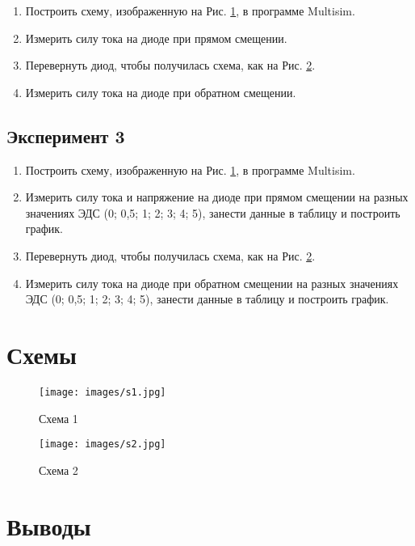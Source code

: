 \documentclass[12pt]{article}
\begin{document}
    \begin{enumerate}
        \item Построить схему, изображенную на Рис. \ref{fig:s:1}, в программе Multisim.
        \item Измерить силу тока на диоде при прямом смещении.
        \item Перевернуть диод, чтобы получилась схема, как на Рис. \ref{fig:s:2}.
        \item Измерить силу тока на диоде при обратном смещении.
    \end{enumerate}

    \subsection*{Эксперимент 3}

    \begin{enumerate}
        \item Построить схему, изображенную на Рис. \ref{fig:s:1}, в программе Multisim.
        \item Измерить силу тока и напряжение на диоде при прямом смещении на разных значениях ЭДС (0; 0,5; 1; 2; 3; 4; 5), занести данные в таблицу и построить график.
        \item Перевернуть диод, чтобы получилась схема, как на Рис. \ref{fig:s:2}.
        \item Измерить силу тока на диоде при обратном смещении на разных значениях ЭДС (0; 0,5; 1; 2; 3; 4; 5), занести данные в таблицу и построить график.
    \end{enumerate}

    \newpage

    \section*{Схемы}

    \begin{figure}[ht]
        \centering
        \texttt{[image: images/s1.jpg]}
        \caption{Схема 1}
        \label{fig:s:1}
    \end{figure}

    \begin{figure}[ht]
        \centering
        \texttt{[image: images/s2.jpg]}
        \caption{Схема 2}
        \label{fig:s:2}
    \end{figure}

    \newpage

    \section*{Выводы}
\end{document}
